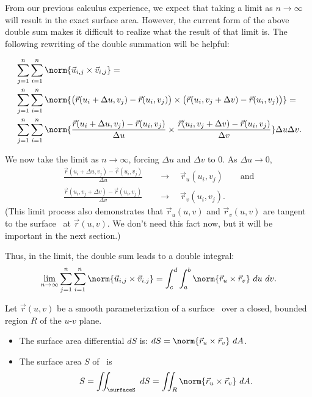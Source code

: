 From our previous calculus experience, we expect that taking a limit as $n\to \infty$ will result in the exact surface area. However, the current form of the above double sum makes it difficult to realize what the result of that limit is. The following rewriting of the double summation will be helpful:

\begin{align*}
&\sum_{j=1}^n\sum_{i=1}^n \norm{\vec u_{i,j}\times \vec v_{i,j}}= \\ 
&\sum_{j=1}^n\sum_{i=1}^n \norm{\bigl(\vec r(u_i+\Delta u,v_j) - \vec r(u_i,v_j)\bigr) \times \bigl(\vec r(u_i,v_j+\Delta v)-\vec r(u_i,v_j)\bigr)}= \\
&\sum_{j=1}^n\sum_{i=1}^n \norm{\frac{\vec r(u_i+\Delta u,v_j) - \vec r(u_i,v_j)}{\Delta u} \times \frac{\vec r(u_i,v_j+\Delta v)-\vec r(u_i,v_j)}{\Delta v}}\Delta u\Delta v.
\end{align*}

We now take the limit as $n\to\infty$, forcing $\Delta u$ and $\Delta v$ to 0. As $\Delta u\to 0$,
\begin{align*}
\frac{\vec r(u_i+\Delta u,v_j) - \vec r(u_i,v_j)}{\Delta u}\quad
&\to\quad \vec r_u(u_i,v_j)\qquad \text{and}\\
\frac{\vec r(u_i,v_j+\Delta v)-\vec r(u_i,v_j)}{\Delta v}\quad
&\to\quad \vec r_v(u_i,v_j).
\end{align*}
(This limit process also demonstrates that $\vec r_u(u,v)$ and $\vec r_v(u,v)$ are tangent to the surface \surfaceS\ at $\vec r(u,v)$. We don't need this fact now, but it will be important in the next section.)

Thus, in the limit, the double sum leads to a double integral:
\[
\lim_{n\to\infty} \sum_{j=1}^n\sum_{i=1}^n \norm{\vec u_{i,j}\times \vec v_{i,j}}
= \int_c^d\int_a^b \norm{\vec r_u\times\vec r_v}\ du\ dv.
\]

\begin{theorem}\label{thm:par_surface_area}
Let $\vec r(u,v)$ be a smooth parameterization of a surface \surfaceS\ over a closed, bounded region $R$ of the $u$-$v$ plane. 
\begin{itemize}
\item	The surface area differential $dS$ is: $dS = \norm{\vec r_u\times \vec r_v}\ dA$.
\item The surface area $S$ of \surfaceS\ is
\[S = \iint_\surfaceS\ dS = \iint_R \norm{\vec r_u\times \vec r_v}\ dA.\]
\end{itemize}
\end{theorem}

